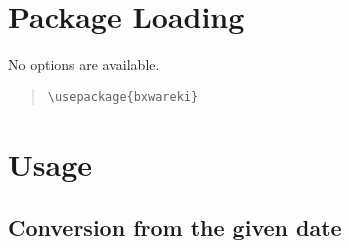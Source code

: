 \documentclass[a4paper]{article}
\newcommand*{\+}{\hspace{0.25em minus 0.25em}}
\begin{document}
\section{Package Loading}
\label{sec:Loading}

No options are available.

\begin{quote}\small\begin{verbatim}
\usepackage{bxwareki}
\end{verbatim}\end{quote}

\section{Usage}
\label{sec:Usage}

\subsection{Conversion from the given date}
\end{document}
